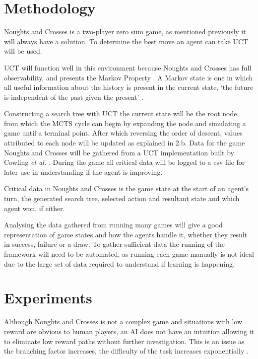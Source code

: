 \documentclass[conference]{IEEEtran}
\begin{document}
\section{Methodology}
Noughts and Crosses is a two-player zero sum game, as mentioned previously it will always have a solution. To determine the best move an agent can take UCT will be used. 

UCT will function well in this environment because Noughts and Crosses has full observability, and presents the Markov Property \cite{ce811}. A Markov state is one in which all useful information about the history is present in the current state, `the future is independent of the past given the present' \cite{ce811}.     

Constructing a search tree with UCT the current state will be the root node, from which the MCTS cycle can begin by expanding the node and simulating a game until a terminal point. After which reversing the order of descent, values attributed to each node will be updated as explained in 2.b.
Data for the game Noughts and Crosses will be gathered from a UCT implementation built by Cowling {\em et al.} \cite{code}. During the game all critical data will be logged to a csv file for later use in understanding if the agent is improving. 

Critical data in Noughts and Crosses is the game state at the start of an agent's turn, the generated search tree, selected action and resultant state and which agent won, if either.

Analysing the data gathered from running many games will give a good representation of game states and how the agents handle it, whether they result in success, failure or a draw. To gather sufficient data the running of the framework will need to be automated, as running each game manually is not ideal due to the large set of data required to understand if learning is happening. 

\section{Experiments}
Although Noughts and Crosses is not a complex game and situations with low reward are obvious to human players, an AI does not have an intuition allowing it to eliminate low reward paths without further investigation. This is an issue as the branching factor increases, the difficulty of the task increases exponentially \cite{branchingfactor}.
\end{document}
